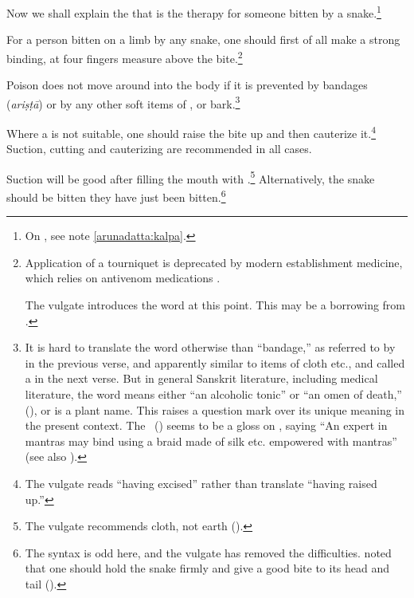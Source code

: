 \begin{translation}
    \item [1]
    Now we shall explain the  that is the therapy for 
    someone bitten by a snake.\footnote{On , see note 
    \ref{arunadatta:kalpa}.}
    
    \item[3] For a person bitten on a limb by any snake, one should first
of all make a strong binding, at four fingers measure above the
bite.\footnote{Application of a tourniquet is deprecated by modern
    establishment medicine, which relies on antivenom medications
    \citep[e.g.,][150--151 et passim in the literature]{pill-2013}.
    
    The vulgate introduces the word  at this point.  This may be a 
    borrowing from .}
    
    
    \item[4]
    
    Poison does not move around into the body if it is prevented by
bandages (\emph{ariṣṭā}) or by any other soft
items of ,  or
bark.\footnote{It is hard to translate the word 
    otherwise than “bandage,” as referred to by  in the
    previous verse, and apparently similar to items of cloth etc., and
    called a  in the next verse.  But in general Sanskrit
    literature, including medical literature, the word means either “an
    alcoholic tonic” or “an omen of death,” (), or is a
    plant name.  This raises a question mark over its unique meaning in
    the present context.  The \AH\ () seems to be a
    gloss on , saying “An expert in mantras may bind using a
    braid made of silk etc. empowered with mantras” (see also
    ).}
    
\item[5] Where a  is not suitable, one should raise
the bite up and then cauterize it.\footnote{The vulgate reads
     “having excised” rather than translate 
    “having raised up.”} Suction, cutting and cauterizing are recommended in
    all cases.

\item[6] Suction will be good after filling the mouth with
.\footnote{The vulgate recommends cloth, not
    earth ().}  Alternatively, the snake should be bitten
     they have just been bitten.\footnote{The 
    syntax is odd here, and the vulgate has removed the difficulties. 
     noted that one should hold the snake firmly and give a 
    good bite to its head and tail ().}


\end{translation}
